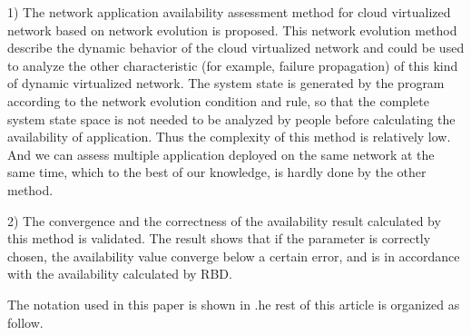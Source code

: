 \documentclass[journal]{IEEEtran}
\begin{document}
    1) The network application availability assessment method for cloud virtualized network based on network evolution is proposed. This network evolution method 
    describe the dynamic behavior of the cloud virtualized network and could be used to analyze the other characteristic (for example, failure propagation) of this kind of dynamic virtualized network. The system state is generated by the program according to the network evolution condition and rule, so that the complete system state space is not needed to be analyzed by people before calculating the availability of application. Thus the complexity of this method is relatively low. And we can assess multiple application deployed on the same network at the same time, which to the best of our knowledge, is hardly done by the other method.
    
    2) The convergence and the correctness of the availability result calculated by this method is validated. The result shows that if the parameter is correctly chosen, the availability value converge below a certain error, and is in accordance with the availability calculated by RBD.
    
    The notation used in this paper is shown in .he rest of this article is organized as follow.
	
\end{document}
